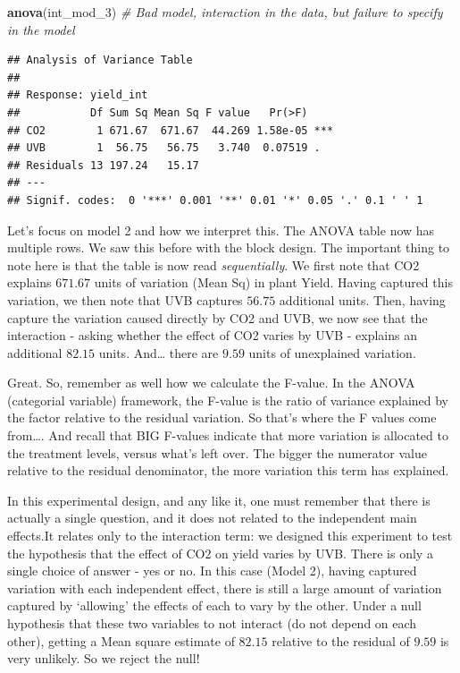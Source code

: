 \documentclass[
]{book}
\newenvironment{Shaded}{\begin{snugshade}}{\end{snugshade}}
\newcommand{\CommentTok}[1]{\textcolor[rgb]{0.56,0.35,0.01}{\textit{#1}}}
\newcommand{\FunctionTok}[1]{\textcolor[rgb]{0.13,0.29,0.53}{\textbf{#1}}}
\newcommand{\NormalTok}[1]{#1}
\begin{document}
\begin{Shaded}
\begin{Highlighting}[]
\FunctionTok{anova}\NormalTok{(int\_mod\_3) }\CommentTok{\# Bad model, interaction in the data, but failure to specify in the model}
\end{Highlighting}
\end{Shaded}

\begin{verbatim}
## Analysis of Variance Table
## 
## Response: yield_int
##           Df Sum Sq Mean Sq F value   Pr(>F)    
## CO2        1 671.67  671.67  44.269 1.58e-05 ***
## UVB        1  56.75   56.75   3.740  0.07519 .  
## Residuals 13 197.24   15.17                     
## ---
## Signif. codes:  0 '***' 0.001 '**' 0.01 '*' 0.05 '.' 0.1 ' ' 1
\end{verbatim}

Let's focus on model 2 and how we interpret this. The ANOVA table now has multiple rows. We saw this before with the block design. The important thing to note here is that the table is now read \emph{sequentially}. We first note that CO2 explains \(671.67\) units of variation (Mean Sq) in plant Yield. Having captured this variation, we then note that UVB captures \(56.75\) additional units. Then, having capture the variation caused directly by CO2 and UVB, we now see that the interaction - asking whether the effect of CO2 varies by UVB - explains an additional \(82.15\) units. And\ldots{} there are \(9.59\) units of unexplained variation.

Great. So, remember as well how we calculate the F-value. In the ANOVA (categorial variable) framework, the F-value is the ratio of variance explained by the factor relative to the residual variation. So that's where the F values come from\ldots. And recall that BIG F-values indicate that more variation is allocated to the treatment levels, versus what's left over. The bigger the numerator value relative to the residual denominator, the more variation this term has explained.

In this experimental design, and any like it, one must remember that there is actually a single question, and it does not related to the independent main effects.It relates only to the interaction term: we designed this experiment to test the hypothesis that the effect of CO2 on yield varies by UVB. There is only a single choice of answer - yes or no. In this case (Model 2), having captured variation with each independent effect, there is still a large amount of variation captured by `allowing' the effects of each to vary by the other. Under a null hypothesis that these two variables to not interact (do not depend on each other), getting a Mean square estimate of \(82.15\) relative to the residual of \(9.59\) is very unlikely. So we reject the null!
\end{document}
